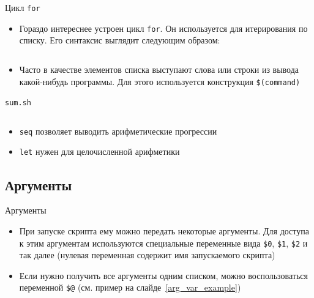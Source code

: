 \documentclass{beamer}
\begin{document}
\begin{frame}{Цикл \texttt{for}}
	\begin{itemize}
		\item{Гораздо интереснее устроен цикл \texttt{for}. Он используется для итерирования по списку. Его синтаксис выглядит следующим образом:}\pause
	\end{itemize}
	\vspace*{-\baselineskip}
	\inputminted[linenos,bgcolor=listing]{bash}{files/01/for.sh}\pause
	\vspace*{-\baselineskip}
	\begin{itemize}
		\item{Часто в качестве элементов списка выступают слова или строки из вывода какой-нибудь программы. Для этого используется конструкция \texttt{\$(command)}}
	\end{itemize}
\end{frame}

\begin{frame}
	\texttt{sum.sh}
	\inputminted[linenos,bgcolor=listing]{bash}{files/01/sum.sh}\pause
	\vspace*{-\baselineskip}
	\begin{itemize}
		\item{\texttt{seq} позволяет выводить арифметические прогрессии}\pause
		\item{\texttt{let} нужен для целочисленной арифметики}
	\end{itemize}
\end{frame}

\subsection{Аргументы}
\begin{frame}{Аргументы}
	\begin{itemize}
		\item{При запуске скрипта ему можно передать некоторые аргументы. Для доступа к этим аргументам используются специальные переменные вида \texttt{\$0}, \texttt{\$1}, \texttt{\$2} и так далее (нулевая переменная содержит имя запускаемого скрипта)}\pause
		\item{Если нужно получить все аргументы одним списком, можно воспользоваться переменной \texttt{\$@} (см. пример на слайде~\ref{arg_var_example})}
	\end{itemize}
\end{frame}
\end{document}

